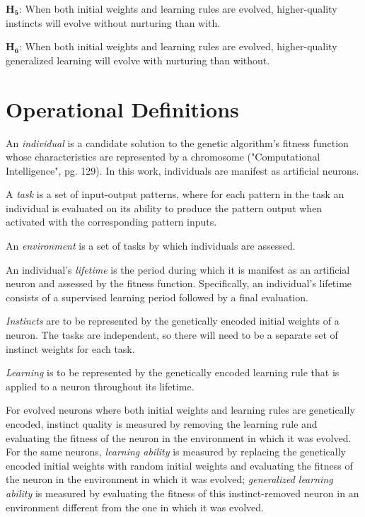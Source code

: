 \documentclass[master]{outhesis}
\begin{document}
$\mathbf{H_5}$: When both initial weights and learning rules are evolved, higher-quality instincts will evolve without nurturing than with.

$\mathbf{H_6}$: When both initial weights and learning rules are evolved, higher-quality generalized learning will evolve with nurturing than without.

\chapter{Operational Definitions}

An \emph{individual} is a candidate solution to the genetic algorithm's fitness function whose characteristics are represented by a chromosome ("Computational Intelligence", pg. 129). In this work, individuals are manifest as artificial neurons. 

A \emph{task} is a set of input-output patterns,
where for each pattern in the task an individual is evaluated on its ability to produce the pattern output when activated with the corresponding pattern inputs.

An \emph{environment} is a set of tasks by which individuals are assessed.

An individual's \emph{lifetime} is the period during which it is manifest as an artificial neuron and assessed by the fitness function. Specifically, an individual's lifetime consists of a supervised learning period followed by a final evaluation.

\emph{Instincts} are to be represented by the genetically encoded initial weights of a neuron. The tasks are independent, so there will need to be a separate set of instinct weights for each task.

\emph{Learning} is to be represented by the genetically encoded learning rule that is applied to a neuron throughout its lifetime.

For evolved neurons where both initial weights and learning rules are genetically encoded, instinct quality is measured by removing the learning rule and evaluating the fitness of the neuron in the environment in which it was evolved.
For the same neurons, \emph{learning ability} is measured by replacing the genetically encoded initial weights with random initial weights and evaluating the fitness of the neuron in the environment in which it was evolved; \emph{generalized learning ability} is measured by evaluating the fitness of this instinct-removed neuron in an environment different from the one in which it was evolved.
\end{document}
